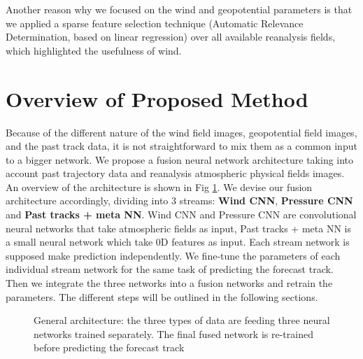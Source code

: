  Another reason why we focused on the wind and geopotential parameters is that we applied a sparse feature selection technique (Automatic Relevance Determination, based on linear regression) over all available reanalysis fields, which highlighted the usefulness of wind.

\section{Overview of Proposed Method}

Because of the different nature of the wind field images, geopotential field images, and the past track data, it is not straightforward to mix them as a common input to a bigger network. We propose a fusion neural network architecture taking into account past trajectory data and reanalysis atmospheric physical fields images. An overview of the architecture is shown in Fig \ref{fig:fusion_arch}. We devise our fusion architecture accordingly, dividing into 3 streams: \textbf{Wind CNN}, \textbf{Pressure CNN} and \textbf{Past tracks + meta NN}. Wind CNN and Pressure CNN are convolutional neural networks that take atmospheric fields as input, Past tracks + meta NN is a small neural network which take 0D features as input. Each stream network is supposed make prediction independently. We fine-tune the parameters of each individual stream network for the same task of predicting the forecast track. Then we integrate the three networks into a fusion networks and retrain the parameters. The different steps will be outlined in the following sections.



\begin{figure} 
	\begin{center}
		\hsize {}
	\end{center}
	\caption{General architecture: the three types of data are feeding three neural networks trained separately. The final fused network is re-trained before predicting the forecast track}
	\label{fig:fusion_arch}
\end{figure}

